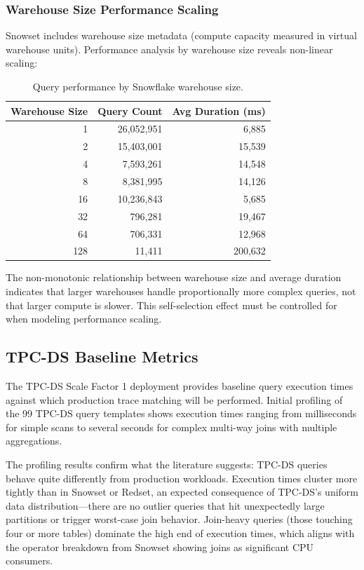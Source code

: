 \documentclass[12pt]{report}
\begin{document}
\subsubsection{Warehouse Size Performance Scaling}

Snowset includes warehouse size metadata (compute capacity measured in virtual warehouse units). Performance analysis by warehouse size reveals non-linear scaling:

\begin{table}[H]
    \centering
    \caption{Query performance by Snowflake warehouse size.}
    \label{tab:warehouse-scaling}
    \begin{tabular}{rrr}
        \toprule
        Warehouse Size & Query Count & Avg Duration (ms) \\
        \midrule
        1 & 26,052,951 & 6,885 \\
        2 & 15,403,001 & 15,539 \\
        4 & 7,593,261 & 14,548 \\
        8 & 8,381,995 & 14,126 \\
        16 & 10,236,843 & 5,685 \\
        32 & 796,281 & 19,467 \\
        64 & 706,331 & 12,968 \\
        128 & 11,411 & 200,632 \\
        \bottomrule
    \end{tabular}
\end{table}

The non-monotonic relationship between warehouse size and average duration indicates that larger warehouses handle proportionally more complex queries, not that larger compute is slower. This self-selection effect must be controlled for when modeling performance scaling.

\subsection{TPC-DS Baseline Metrics}
\label{subsec:tpcds-metrics}

The TPC-DS Scale Factor 1 deployment provides baseline query execution times against which production trace matching will be performed. Initial profiling of the 99 TPC-DS query templates shows execution times ranging from milliseconds for simple scans to several seconds for complex multi-way joins with multiple aggregations.

The profiling results confirm what the literature suggests: TPC-DS queries behave quite differently from production workloads. Execution times cluster more tightly than in Snowset or Redset, an expected consequence of TPC-DS's uniform data distribution---there are no outlier queries that hit unexpectedly large partitions or trigger worst-case join behavior. Join-heavy queries (those touching four or more tables) dominate the high end of execution times, which aligns with the operator breakdown from Snowset showing joins as significant CPU consumers.
\end{document}
